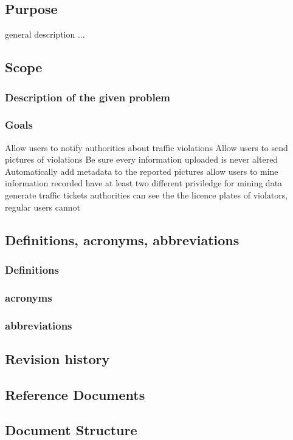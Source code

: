 




\subsection{Purpose}
general description ...

\subsection{Scope}

\subsubsection{Description of the given problem}


\subsubsection{Goals}
\begin{enumerate}
   Allow users to notify authorities about traffic violations
   Allow users to send pictures of violations
   Be sure every information uploaded is never altered
   Automatically add metadata to the reported pictures
   allow users to mine information recorded
   have at least two different  priviledge for mining data
   generate traffic tickets
   authorities can see the the licence plates of violators, regular users cannot

\end{enumerate}



\subsection{Definitions,  acronyms,  abbreviations}
\subsubsection{Definitions}
\subsubsection{acronyms}
\subsubsection{abbreviations}


\subsection{Revision history}


\subsection{Reference Documents}



\subsection{Document Structure}
